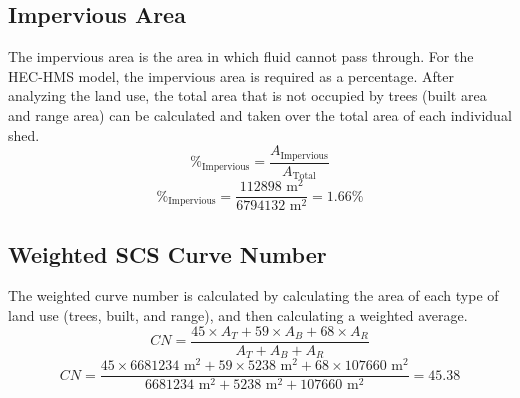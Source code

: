 \documentclass{article}
\begin{document}
\subsection{Impervious Area}
\noindent The impervious area is the area in which fluid cannot pass through. For the HEC-HMS model, the impervious area is required as a percentage. After analyzing the land use, the total area that is not occupied by trees (built area and range area) can be calculated and taken over the total area of each individual shed.
\[\%_\text{Impervious}=\frac{A_\text{Impervious}}{A_\text{Total}}\]
\[\%_\text{Impervious}=\frac{112898\text{ m}^2}{6794132\text{ m}^2}=\boxed{1.66\%}\]
\subsection{Weighted SCS Curve Number}
\noindent The weighted curve number is calculated by calculating the area of each type of land use (trees, built, and range), and then calculating a weighted average. 
\[CN=\frac{45\times A_T+59\times A_B+68\times A_R}{A_T+A_B+A_R}\]
\[CN=\frac{45\times 6681234\text{ m}^2+59\times 5238\text{ m}^2+68\times 107660\text{ m}^2}{6681234\text{ m}^2+5238\text{ m}^2+107660\text{ m}^2}=\boxed{45.38}\]
\newpage
\end{document}
